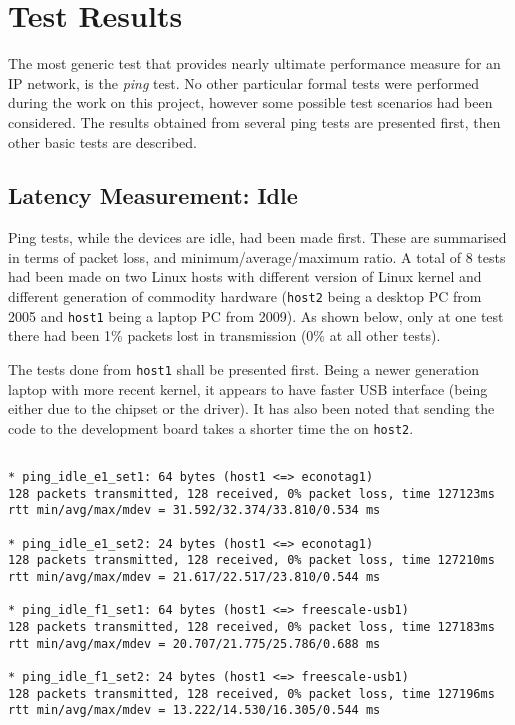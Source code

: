 \section{Test Results}

  The most generic test that provides nearly ultimate performance measure
 for an IP network, is the \emph{ping} test. No other particular formal
 tests were performed during the work on this project, however some
 possible test scenarios had been considered. The results obtained from
 several ping tests are presented first, then other basic tests are described.

\subsection{Latency Measurement: Idle}


   Ping tests, while the devices are idle, had been made first. These are
  summarised in terms of packet loss, and minimum/average/maximum ratio.
  A total of 8 tests had been made on two Linux hosts with different
  version of Linux kernel and different generation of commodity hardware
  (\texttt{host2} being a desktop PC from 2005 and \texttt{host1} being
  a laptop PC from 2009). As shown below, only at one test there had
  been 1\% packets lost in transmission (0\% at all other tests).

   The tests done from \texttt{host1} shall be presented first. Being a
  newer generation laptop with more recent kernel, it appears to have
  faster USB interface (being either due to the chipset or the driver).
  It has also been noted that sending the code to the development
  board takes a shorter time the on \texttt{host2}.

\begin{verbatim}

* ping_idle_e1_set1: 64 bytes (host1 <=> econotag1)
128 packets transmitted, 128 received, 0% packet loss, time 127123ms
rtt min/avg/max/mdev = 31.592/32.374/33.810/0.534 ms

* ping_idle_e1_set2: 24 bytes (host1 <=> econotag1)
128 packets transmitted, 128 received, 0% packet loss, time 127210ms
rtt min/avg/max/mdev = 21.617/22.517/23.810/0.544 ms

* ping_idle_f1_set1: 64 bytes (host1 <=> freescale-usb1)
128 packets transmitted, 128 received, 0% packet loss, time 127183ms
rtt min/avg/max/mdev = 20.707/21.775/25.786/0.688 ms

* ping_idle_f1_set2: 24 bytes (host1 <=> freescale-usb1)
128 packets transmitted, 128 received, 0% packet loss, time 127196ms
rtt min/avg/max/mdev = 13.222/14.530/16.305/0.544 ms

\end{verbatim}


